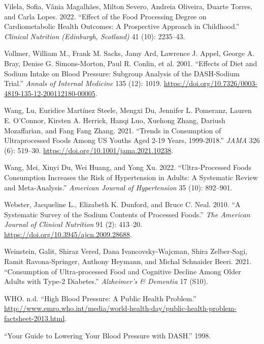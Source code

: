 \documentclass[
]{article}
\newlength{\cslhangindent}
\newlength{\cslentryspacingunit} %
\newenvironment{CSLReferences}[2] %
 {%
  \setlength{\parindent}{0pt}
  \ifodd #1
  \let\oldpar\par
  \def\par{\hangindent=\cslhangindent\oldpar}
  \fi
  \setlength{\parskip}{#2\cslentryspacingunit}
 }%
 {}
\begin{document}
\begin{CSLReferences}{1}{0}
\leavevmode{}%
Vilela, Sofia, Vânia Magalhães, Milton Severo, Andreia Oliveira, Duarte
Torres, and Carla Lopes. 2022. {``Effect of the Food Processing Degree
on Cardiometabolic Health Outcomes: {A} Prospective Approach in
Childhood.''} \emph{Clinical Nutrition (Edinburgh, Scotland)} 41 (10):
2235--43.

\leavevmode{}%
Vollmer, William M., Frank M. Sacks, Jamy Ard, Lawrence J. Appel, George
A. Bray, Denise G. Simons-Morton, Paul R. Conlin, et al. 2001.
{``Effects of Diet and Sodium Intake on Blood Pressure: Subgroup
Analysis of the DASH-Sodium Trial.''} \emph{Annals of Internal Medicine}
135 (12): 1019.
\url{https://doi.org/10.7326/0003-4819-135-12-200112180-00005}.

\leavevmode{}%
Wang, Lu, Euridice Martínez Steele, Mengxi Du, Jennifer L. Pomeranz,
Lauren E. O'Connor, Kirsten A. Herrick, Hanqi Luo, Xuehong Zhang,
Dariush Mozaffarian, and Fang Fang Zhang. 2021. {``Trends in Consumption
of Ultraprocessed Foods Among US Youths Aged 2-19 Years, 1999-2018.''}
\emph{JAMA} 326 (6): 519--30.
\url{https://doi.org/10.1001/jama.2021.10238}.

\leavevmode{}%
Wang, Mei, Xinyi Du, Wei Huang, and Yong Xu. 2022. {``Ultra-Processed
Foods Consumption Increases the Risk of Hypertension in Adults: {A}
Systematic Review and Meta-Analysis.''} \emph{American Journal of
Hypertension} 35 (10): 892--901.

\leavevmode{}%
Webster, Jacqueline L., Elizabeth K. Dunford, and Bruce C. Neal. 2010.
{``A Systematic Survey of the Sodium Contents of Processed Foods.''}
\emph{The American Journal of Clinical Nutrition} 91 (2): 413--20.
\url{https://doi.org/10.3945/ajcn.2009.28688}.

\leavevmode{}%
Weinstein, Galit, Shiraz Vered, Dana Ivancovsky‐Wajcman, Shira
Zelber‐Sagi, Ramit Ravona‐Springer, Anthony Heymann, and Michal
Schnaider Beeri. 2021. {``Consumption of Ultra‐processed Food and
Cognitive Decline Among Older Adults with Type‐2 Diabetes.''}
\emph{Alzheimer's \& Dementia} 17 (S10).

\leavevmode{}%
WHO. n.d. {``High Blood Pressure: A Public Health Problem.''}
\url{http://www.emro.who.int/media/world-health-day/public-health-problem-factsheet-2013.html}.

\leavevmode{}%
{``Your Guide to Lowering Your Blood Pressure with DASH.''} 1998.

\end{CSLReferences}
\end{document}
